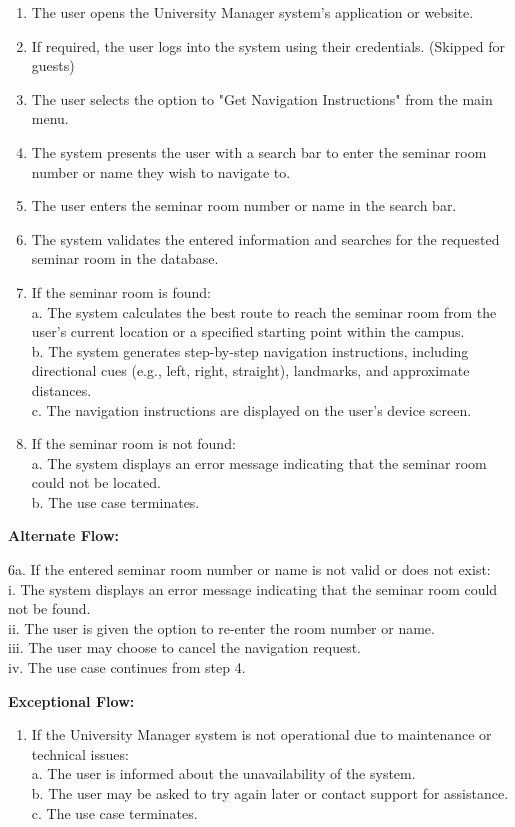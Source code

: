 \documentclass[article,onecolumn]{IEEEtran}
\begin{document}
\begin{framed}
	\begin{enumerate}
		\item     The user opens the University Manager system's application or website.
		\item If required, the user logs into the system using their credentials. (Skipped for guests)
		\item The user selects the option to "Get Navigation Instructions" from the main menu.
		\item The system presents the user with a search bar to enter the seminar room number or name they wish to navigate to.
		\item The user enters the seminar room number or name in the search bar.
		\item The system validates the entered information and searches for the requested seminar room in the database.
		\item If the seminar room is found:\\
		a. The system calculates the best route to reach the seminar room from the user's current location or a specified starting point within the campus.\\
		b. The system generates step-by-step navigation instructions, including directional cues (e.g., left, right, straight), landmarks, and approximate distances.\\
		c. The navigation instructions are displayed on the user's device screen.
		\item If the seminar room is not found:\\
		a. The system displays an error message indicating that the seminar room could not be located.\\
		b. The use case terminates.
	\end{enumerate}
	
	\textbf{Alternate Flow:}
	
	6a. If the entered seminar room number or name is not valid or does not exist:\\
	i. The system displays an error message indicating that the seminar room could not be found.\\
	ii. The user is given the option to re-enter the room number or name.\\
	iii. The user may choose to cancel the navigation request.\\
	iv. The use case continues from step 4.
	
	\textbf{Exceptional Flow:}
	
	\begin{enumerate}
		\item If the University Manager system is not operational due to maintenance or technical issues:\\
		a. The user is informed about the unavailability of the system.\\
		b. The user may be asked to try again later or contact support for assistance.\\
		c. The use case terminates.
	\end{enumerate}
	

\end{framed}
\end{document}
